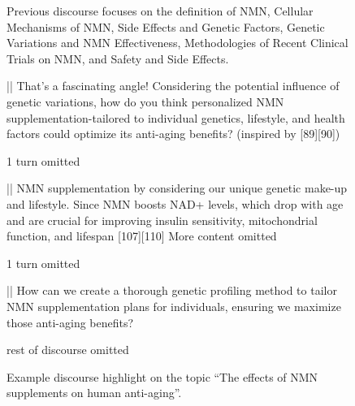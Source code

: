 \documentclass[11pt]{article}
\begin{document}
\begin{figure}
    
\begin{showcase}[title=Topic: The effects of NMN supplements on human anti-aging]

{Previous discourse focuses on the definition of NMN, Cellular Mechanisms of NMN, Side Effects and Genetic Factors, Genetic Variations and NMN Effectiveness, Methodologies of Recent Clinical Trials on NMN, and Safety and Side Effects.}

||
That's a fascinating angle! Considering the potential influence of genetic variations, how do you think personalized NMN supplementation-tailored to individual genetics, lifestyle, and health factors could optimize its anti-aging benefits? 
 (inspired by [89][90])

{1 turn omitted}

||
NMN supplementation by considering our unique genetic make-up and lifestyle. Since NMN boosts NAD+ levels, which drop with age and are crucial for improving insulin sensitivity, mitochondrial function, and lifespan [107][110] {More content omitted}

{1 turn omitted}

||
How can we create a thorough genetic profiling method to tailor NMN supplementation plans for individuals, ensuring we maximize those anti-aging benefits?

{rest of discourse omitted}

\end{showcase}

    \caption{Example discourse highlight on the topic ``The effects of NMN supplements on human anti-aging''.}
    \label{showcase:showcase1}
\end{figure}
\end{document}
